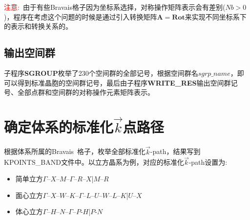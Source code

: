 \textcolor{red}{注意:~}由于有些\textrm{Bravais}格子因为坐标系选择，对称操作矩阵表示会有差别($\mathit{Nb}>0$)，程序在考虑这个问题的时候是通过引入转换矩阵$\mathbf{A}=\mathbf{Rot}$来实现不同坐标系下的表示和转换关系的。
\subsection{输出空间群}
子程序\textbf{SGROUP}枚举了230个空间群的全部记号，根据空间群名$\mathit{sgrp\_name}$，即可以得到标准晶胞的空间群记号，最后由子程序\textbf{WRITE\_RES}输出空间群记号、全部点群和空间群的对称操作元素矩阵表示。

\section{确定体系的标准化$\vec k$点路径}
根据体系所属的\textrm{Bravais~}格子，枚举全部标准化$\vec k$-\textrm{path}，结果写到\textrm{KPOINTS\_BAND}文件中。以立方晶系为例，对应的标准化$\vec k$-\textrm{path}设置为:~
\begin{itemize}
	\item 简单立方\quad $\Gamma$–$X$–$M$–$\Gamma$–$R$–$X$|$M$–$R$
	\item 面心立方\quad $\Gamma$–$X$–$W$–$K$–$\Gamma$–$L$–$U$–$W$–$L$–$K$|$U$–$X$
	\item 体心立方\quad $\Gamma$–$H$–$N$–$\Gamma$–$P$-$H$|$P$-$N$
\end{itemize}

